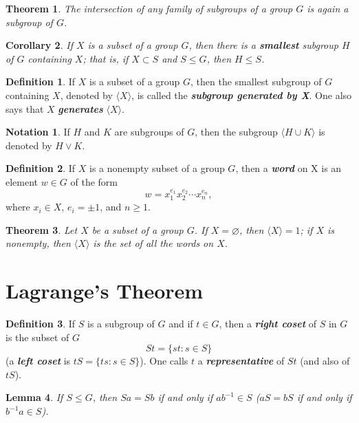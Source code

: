 \documentclass[10pt]{report}
\newtheorem{theorem}{Theorem}[chapter]
\newtheorem{corollary}[theorem]{Corollary}
\newtheorem{lemma}[theorem]{Lemma}
\theoremstyle{definition}
\newtheorem*{definition}{Definition}
\newtheorem*{notation}{Notation}
\newcommand{\term}[1]{\textbf{\textit{#1}}}
\newcommand{\gen}[1]{{\langle}#1{\rangle}}
\begin{document}
\begin{theorem}
	The intersection of any family of subgroups of a group $G$ is again a subgroup of $G$.
\end{theorem}

\begin{corollary}
	If $X$ is a subset of a group $G$, then there is a \textbf{smallest} subgroup $H$ of $G$ containing $X$; that is, if $X\subset S$ and $S\leq G$, then $H\leq S$.
\end{corollary}

\begin{definition}
	If $X$ is a subset of a group $G$, then the smallest subgroup of $G$ containing $X$, denoted by $\gen{X}$, is called the \term{subgroup generated by X}.
	One also says that $X$ \term{generates} $\gen{X}$.
\end{definition}

\begin{notation}
	If $H$ and $K$ are subgroups of $G$, then the subgroup $\gen{H\cup K}$ is denoted by $H\vee K$.
\end{notation}

\begin{definition}
	If $X$ is a nonempty subset of a group $G$, then a \term{word} on X is an element $w\in G$ of the form
	\[ w = x_1^{e_1} x_2^{e_2} \cdots x_n^{e_n}, \]
	where $x_i\in X$, $e_i=\pm1$, and $n\geq1$.
\end{definition}

\begin{theorem}
	Let $X$ be a subset of a group $G$. If $X=\varnothing$, then $\gen{X}=1$; if $X$ is nonempty, then $\gen{X}$ is the set of all the words on $X$.
\end{theorem}

\section{Lagrange's Theorem}
\begin{definition}
	If $S$ is a subgroup of $G$ and if $t\in G$, then a \term{right coset} of $S$ in $G$ is the subset of $G$
	\[ St = \{ st: s\in S \} \]
	(a \term{left coset} is $tS = \{ ts: s\in S \}$). One calls $t$ a \term{representative} of $St$ (and also of $tS$).
\end{definition}

\begin{lemma}
	If $S\leq G$, then $Sa=Sb$ if and only if $ab^{-1}\in S$ ($aS=bS$ if and only if $b^{-1}a\in S$).
\end{lemma}
\end{document}
